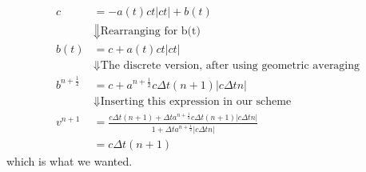 \documentclass[11pt]{article} %
\begin{document}
\begin{align*}
c &= -a(t)ct|ct| + b(t) \\
&\Downarrow \text{Rearranging for b(t)}\\
b(t) &= c + a(t)ct|ct| \\
&\Downarrow \text{The discrete version, after using geometric averaging}\\
b^{n+\frac{1}{2}} &= c + a^{n+\frac{1}{2}}c\Delta t(n+1)|c\Delta t n| \\
&\Downarrow  \text{Inserting this expression in our scheme}\\
v^{n+1} &= \frac{c\Delta t (n+1) + \Delta t a^{n+\frac{1}{2}}c\Delta t(n+1)|c\Delta t n|}{1 + 
\Delta t  a^{n+\frac{1}{2}}|c\Delta t n|}  \\
             &= c\Delta t (n+1)
\end{align*}
which is what we wanted. 
\end{document}
